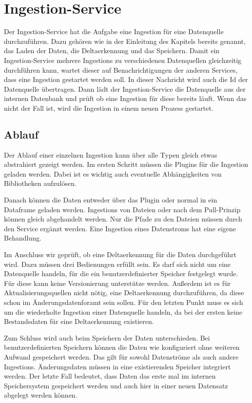 \section{Ingestion-Service}

Der Ingestion-Service hat die Aufgabe eine Ingestion für eine Datenquelle durchzuführen.
Dazu gehören wie in der Einleitung des Kapitels bereits genannt, das Laden der Daten, die Deltaerkennung und das Speichern.
Damit ein Ingestion-Service mehrere Ingestions zu verschiedenen Datenquellen gleichzeitig durchführen kann, wartet dieser auf Benachrichtigungen der anderen Services, dass eine Ingestion gestartet werden soll.
In dieser Nachricht wird auch die Id der Datenquelle übertragen.
Dann lädt der Ingestion-Service die Datenquelle aus der internen Datenbank und prüft ob eine Ingestion für diese bereits läuft.
Wenn das nicht der Fall ist, wird die Ingestion in einem neuen Prozess gestartet.

\subsection{Ablauf}
Der Ablauf einer einzelnen Ingestion kann über alle Typen gleich etwas abstrahiert gezeigt werden.
Im ersten Schritt müssen die Plugins für die Ingestion geladen werden.
Dabei ist es wichtig auch eventuelle Abhängigkeiten von Bibliotheken aufzulösen.

Danach können die Daten entweder über das Plugin oder normal in ein Dataframe geladen werden.
Ingestions von Dateien oder nach dem Pull-Prinzip können gleich abgehandelt werden.
Nur die Pfade zu den Dateien müssen durch den Service ergänzt werden.
Eine Ingestion eines Datenstroms hat eine eigene Behandlung.

Im Anschluss wir geprüft, ob eine Deltaerkennung für die Daten durchgeführt wird.
Dazu müssen drei Bedienungen erfüllt sein.
Es darf sich nicht um eine Datenquelle handeln, für die ein benutzerdefinierter Speicher festgelegt wurde.
Für diese kann keine Versionierung unterstütze werden.
Außerdem ist es für Aktualisierungsquellen nicht nötig, eine Deltaerkennung  durchzuführen, da diese schon im Änderungsdatenforamt sein sollen.
Für den letzten Punkt muss es sich um die wiederholte Ingestion einer Datenquelle handeln, da bei der ersten keine Bestandsdaten für eine Deltaerkennung existieren.

Zum Schluss wird auch beim Speichern der Daten unterschieden.
Bei benutzerdefinierten Speichern können die Daten wie konfiguriert ohne weiteren Aufwand gespeichert werden.
Das gilt für sowohl Datenströme als auch andere Ingestions.
Änderungsdaten müssen in eine existierenden Speicher integriert werden.
Der letzte Fall bedeutet, dass Daten das erste mal im internen Speichersystem gespeichert werden und auch hier in einer neuen Datensatz abgelegt werden können.